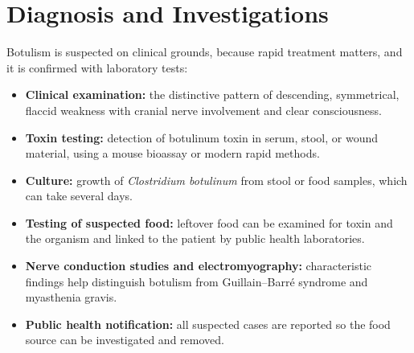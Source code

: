 \section*{Diagnosis and Investigations}
Botulism is suspected on clinical grounds, because rapid treatment matters, and it is confirmed with laboratory tests:
\begin{itemize}
    \item \textbf{Clinical examination:} the distinctive pattern of descending, symmetrical, flaccid weakness with cranial nerve involvement and clear consciousness.
    \item \textbf{Toxin testing:} detection of botulinum toxin in serum, stool, or wound material, using a mouse bioassay or modern rapid methods.
    \item \textbf{Culture:} growth of \textit{Clostridium botulinum} from stool or food samples, which can take several days.
    \item \textbf{Testing of suspected food:} leftover food can be examined for toxin and the organism and linked to the patient by public health laboratories.
    \item \textbf{Nerve conduction studies and electromyography:} characteristic findings help distinguish botulism from Guillain--Barr\'e syndrome and myasthenia gravis.
    \item \textbf{Public health notification:} all suspected cases are reported so the food source can be investigated and removed.
\end{itemize}

